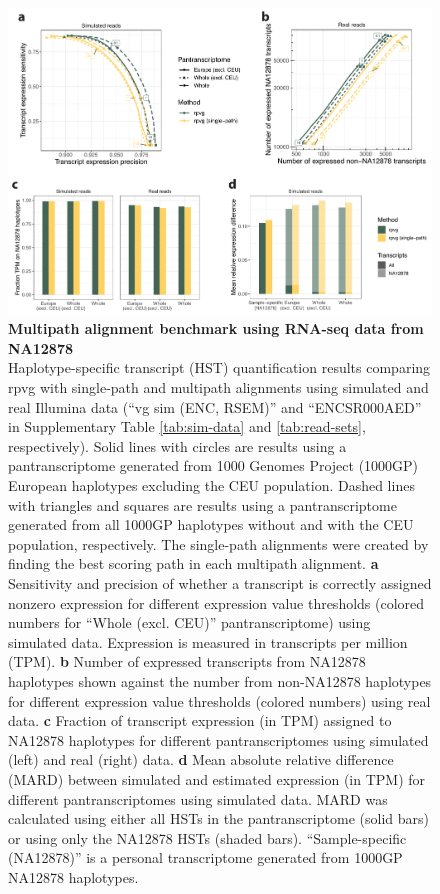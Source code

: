\documentclass[11pt]{ucthesis}
\begin{document}
\begin{figure}[H]
\begin{center}
\includegraphics[width=\textwidth]{mpmapfigures/figureS7.pdf}
\caption{\textbf{Multipath alignment benchmark using RNA-seq data from NA12878} \\
Haplotype-specific transcript (HST) quantification results comparing rpvg with single-path and multipath alignments using simulated and real Illumina data (``vg sim (ENC, RSEM)'' and ``ENCSR000AED'' in Supplementary Table \ref{tab:sim-data} and \ref{tab:read-sets}, respectively). Solid lines with circles are results using a pantranscriptome generated from 1000 Genomes Project (1000GP) European haplotypes excluding the CEU population. Dashed lines with triangles and squares are results using a pantranscriptome generated from all 1000GP haplotypes without and with the CEU population, respectively. The single-path alignments were created by finding the best scoring path in each multipath alignment. \textbf{a} Sensitivity and precision of whether a transcript is correctly assigned nonzero expression for different expression value thresholds (colored numbers for ``Whole (excl. CEU)'' pantranscriptome) using simulated data. Expression is measured in transcripts per million (TPM). \textbf{b} Number of expressed transcripts from NA12878 haplotypes shown against the number from non-NA12878 haplotypes for different expression value thresholds (colored numbers) using real data. \textbf{c} Fraction of transcript expression (in TPM) assigned to NA12878 haplotypes for different pantranscriptomes using simulated (left) and real (right) data. \textbf{d} Mean absolute relative difference (MARD) between simulated and estimated expression (in TPM) for different pantranscriptomes using simulated data. MARD was calculated using either all HSTs in the pantranscriptome (solid bars) or using only the NA12878 HSTs (shaded bars). ``Sample-specific (NA12878)'' is a personal transcriptome generated from 1000GP NA12878 haplotypes.
} \label{fig:expression-multipath}
\end{center}
\end{figure}
\end{document}

